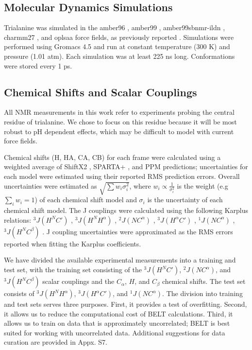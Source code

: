\documentclass[11pt,titlepage]{article}
\begin{document}
\subsection*{Molecular Dynamics Simulations}

Trialanine was simulated in the amber96 \citep{kollman1996}, amber99 \citep{wang2000}, amber99sbnmr-ildn \citep{li2010, Lindorff-Larsen2010}, charmm27 \citep{mackerell2004extending,bjelkmar2010implementation}, and oplsaa \citep{kaminski2001evaluation} force fields, as previously reported  \citep{beauchamp2012protein}.  Simulations were performed using Gromacs 4.5  \citep{hess2008} and run at constant temperature (300 K) and pressure (1.01 atm).  Each simulation was at least 225 ns long.  Conformations were stored every 1 ps.  

\subsection*{Chemical Shifts and Scalar Couplings}

All NMR measurements in this work refer to experiments  \citep{Graf2007} probing the central residue of trialanine.  We chose to focus on this residue because it will be most robust to pH dependent effects, which may be difficult to model with current force fields.  

Chemical shifts (H, HA, CA, CB) for each frame were calculated using a weighted average of ShiftX2 \citep{han2011shiftx2}, SPARTA+  \citep{Shen2010}, and PPM \citep{li2012ppm} predictions; uncertainties for each model were estimated using their reported RMS prediction errors.  Overall uncertainties were estimated as $\sqrt{\sum w_i \sigma_i^2}$, where $w_i \propto \frac{1}{\sigma_i^2}$ is the weight (e.g $\sum_i w_i = 1$) of each chemical shift model and $\sigma_i$ is the uncertainty of each chemical shift model.  The J couplings were calculated using the following Karplus relations: $^3J(H^N C')$  \citep{vogeli2007limits}, $^3J(H^N H^\alpha)$  \citep{vogeli2007limits}, $^2J(N C^\alpha)$  \citep{Graf2007}, $^3J(H^\alpha C')$  \citep{Schmidt1999}, $^1J(N C^\alpha)$  \citep{Graf2007}, $^3J(H^N C^\beta)$  \citep{vogeli2007limits}.  J coupling uncertainties were approximated as the RMS errors reported when fitting the Karplus coefficients.  

We have divided the available experimental measurements into a training and test set, with the training set consisting of the $^3J(H^N C')$,  $^2J(N C^\alpha)$, and $^3J(H^N C^\beta)$ scalar couplings and the $C_\alpha$, $H$, and $C_\beta$ chemical shifts.  The test set consists of $^3J(H^N H^\alpha)$, $^3J(H^\alpha C')$, and $^1J(N C^\alpha)$.  The division into training and test sets serves three purposes.  First, it provides a test of overfitting.  Second, it allows us to reduce the computational cost of BELT calculations.  Third, it allows us to train on data that is approximately uncorrelated; BELT is best suited for working with uncorrelated data.  Additional suggestions for data curation are provided in Appx. S7.  
\end{document}
